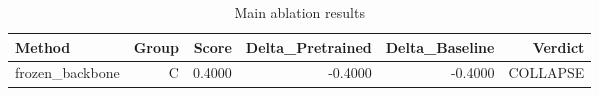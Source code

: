 \begin{table}[htbp]
\centering
\caption{Main ablation results}
\label{tab:main-results}
\begin{tabular}{lrrrrr}
\toprule
\textbf{Method} & \textbf{Group} & \textbf{Score} & \textbf{Delta\_Pretrained} & \textbf{Delta\_Baseline} & \textbf{Verdict} \\
\midrule
frozen\_backbone & C & 0.4000 & -0.4000 & -0.4000 & COLLAPSE \\
\bottomrule
\end{tabular}
\end{table}